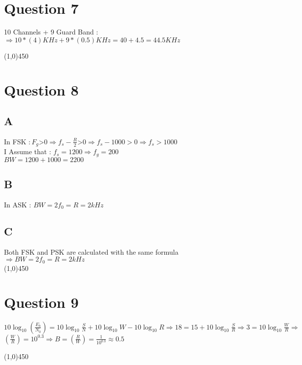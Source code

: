 \documentclass[a4paper,12pt]{article}
\begin{document}
\section {Question 7 }
\begin{doublespace}
10 Channels + 9 Guard Band : $\Longrightarrow  10 * (4 )KHz + 9 * (0.5) KHz = 40 + 4.5 = 44.5 KHz $ 
\end{doublespace}
\line(1,0){450}


\section {Question 8 }

\subsection{A}
\begin{doublespace}
In FSK $: F_g $>$  0 \Longrightarrow f_s - \frac{R}{2}  $>$  0 \Longrightarrow  f_s - 1000 > 0 \Longrightarrow f_s > 1000 $ \\
I Assume that : $f_s = 1200 \Longrightarrow f_g = 200$ \\
$BW = 1200 + 1000 = 2200$\\
\end{doublespace}



\subsection{B}
In ASK : $BW = 2f_0 = R = 2 kHz$ \\


\subsection{C}
Both FSK and PSK are calculated with the same formula $\Longrightarrow BW = 2f_0 = R = 2 kHz $\\
\line(1,0){450}
\section {Question 9 }
\begin{doublespace}
$10 \log_{10}{(\frac{E_b}{N_0})} = 10 \log_{10}{\frac{S}{N}} + 10 \log_{10}{W} - 10 \log_{10}{R} \Longrightarrow 18 = 15 + 10 \log_{10}{\frac{S}{R}} \Longrightarrow 3 = 10 \log_{10}{\frac{W}{R}} \Longrightarrow$\\
$ (\frac{W}{R}) = 10^{0.3} \Longrightarrow B = (\frac{R}{W}) = \frac{1}{10^{0.3}} \approx 0.5$
\end{doublespace}
\line(1,0){450}

\end{document}
